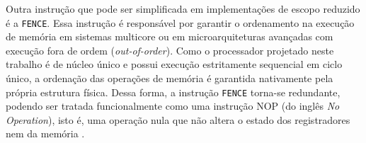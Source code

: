 Outra instrução que pode ser simplificada em implementações de escopo reduzido é a \texttt{FENCE}. Essa instrução é responsável por garantir o ordenamento na execução de memória em sistemas multicore ou em microarquiteturas avançadas com execução fora de ordem (\textit{out-of-order}). Como o processador projetado neste trabalho é de núcleo único e possui execução estritamente sequencial em ciclo único, a ordenação das operações de memória é garantida nativamente pela própria estrutura física. Dessa forma, a instrução \texttt{FENCE} torna-se redundante, podendo ser tratada funcionalmente como uma instrução NOP (do inglês \textit{No Operation}), isto é, uma operação nula que não altera o estado dos registradores nem da memória \cite{riscv_manual_2026}.

